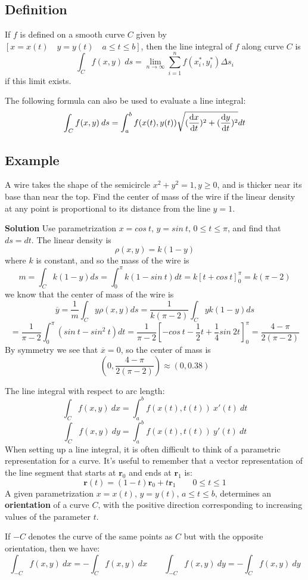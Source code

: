 \subsection*{Definition}
If $f$ is defined on a smooth curve $C$ given by $\left[x=x(t)\quad y=y(t)\quad
                a\leq t\leq b \right]$, then the line integral of $f$ along curve $C$ is
$$\int_C f(x,y)\:ds=\lim_{n\to\infty}\sum_{i=1}^nf(x_i^*,y_i^*)\Delta s_i$$
if this limit exists.

The following formula can also be used to evaluate a line integral:
$$\int_C f(x,y)\:ds=\int_a^b f(x(t),y(t))\sqrt{(\dv{x}{t})^2+(\dv{y}{t})^2}dt$$

\subsection*{Example}
A wire takes the shape of the semicircle $x^2+y^2=1, y \geq 0$, and is thicker
near its base than near the top. Find the center of mass of the wire if the linear
density at any point is proportional to its distance from the line $y=1$.

\textbf{Solution}
Use parametrization $x=cos\:t$, $y=sin\:t$, $0\leq t\leq\pi$, and find that $ds=dt$.
The linear density is
$$\rho(x,y)=k(1-y)$$
where $k$ is constant, and so the mass of the wire is
$$m=\int_C k(1-y)ds=\int_0^\pi k(1-sin\:t)dt=k[t+cos\:t]_0^\pi=k(\pi-2)$$
we know that the center of mass of the wire is
$$\overline{y}=\frac{1}{m}\int_C y\rho(x,y)ds=\frac{1}{k(\pi -2)}\int_C yk(1-y)ds$$
$$=\frac{1}{\pi-2}\int_0^\pi(sin\:t-sin^2\:t)dt=\frac{1}{\pi-2}\left[-cos\:t-\frac{1}{2}t+
                \frac{1}{4}sin\:2t\right]_0^\pi=\frac{4-\pi}{2(\pi-2)}$$
By symmetry we see that $\overline{x}=0$, so the center of mass is
$$\left(0, \frac{4-\pi}{2(\pi-2)}\right)\approx(0, 0.38)$$

The line integral with respect to arc length:
$$\int_C f(x,y)\:dx=\int_a^b f(x(t),t(t))\:x'(t)\:dt$$
$$\int_C f(x,y)\:dy=\int_a^b f(x(t),t(t))\:y'(t)\:dt$$
When setting up a line integral, it is often difficult to think of a parametric
representation for a curve. It's useful to remember that a vector representation
of the line segment that starts at $\textbf{r}_0$ and ends at $\textbf{r}_1$ is:
$$\textbf{r}(t)=(1-t)\textbf{r}_0+t\textbf{r}_1\qquad 0\leq t\leq 1$$
A given parametrization $x=x(t)$, $y=y(t)$, $a\leq t\leq b$, determines an
\textbf{orientation} of a curve $C$, with the positive direction corresponding to
increasing values of the parameter $t$.

If $-C$ denotes the curve of the same points as $C$ but with the opposite orientation,
then we have:
$$\int_{-C}f(x,y)\:dx=-\int_Cf(x,y)\:dx\qquad\int_{-C}f(x,y)\:dy=-\int_Cf(x,y)\:dy$$

